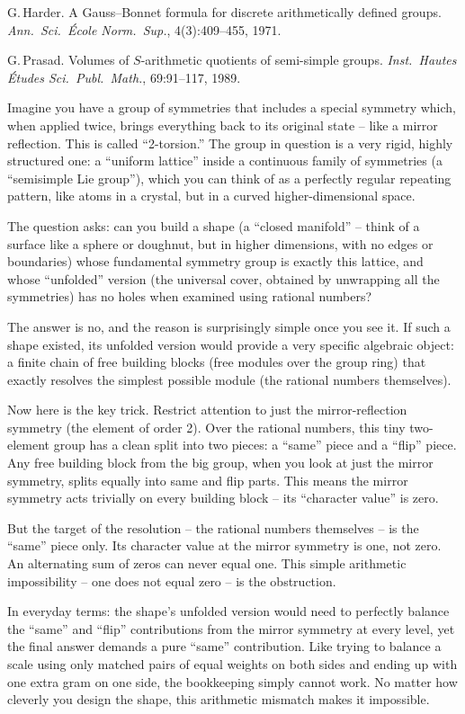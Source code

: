  G.\,Harder.
A Gauss--Bonnet formula for discrete arithmetically defined groups.
\emph{Ann.\ Sci.\ \'Ecole Norm.\ Sup.}, 4(3):409--455, 1971.

 G.\,Prasad.
Volumes of $S$-arithmetic quotients of semi-simple groups.
\emph{Inst.\ Hautes \'Etudes Sci.\ Publ.\ Math.}, 69:91--117, 1989.


Imagine you have a group of symmetries that includes a special symmetry which,
when applied twice, brings everything back to its original state -- like a
mirror reflection. This is called ``2-torsion.'' The group in question is a
very rigid, highly structured one: a ``uniform lattice'' inside a continuous
family of symmetries (a ``semisimple Lie group''), which you can think of as a
perfectly regular repeating pattern, like atoms in a crystal, but in a curved
higher-dimensional space.

The question asks: can you build a shape (a ``closed manifold'' -- think of a
surface like a sphere or doughnut, but in higher dimensions, with no edges or
boundaries) whose fundamental symmetry group is exactly this lattice, and whose
``unfolded'' version (the universal cover, obtained by unwrapping all the
symmetries) has no holes when examined using rational numbers?

The answer is no, and the reason is surprisingly simple once you see it. If
such a shape existed, its unfolded version would provide a very specific
algebraic object: a finite chain of free building blocks (free modules over the
group ring) that exactly resolves the simplest possible module (the rational
numbers themselves).

Now here is the key trick. Restrict attention to just the mirror-reflection
symmetry (the element of order 2). Over the rational numbers, this tiny
two-element group has a clean split into two pieces: a ``same'' piece and a
``flip'' piece. Any free building block from the big group, when you look at
just the mirror symmetry, splits equally into same and flip parts. This means
the mirror symmetry acts trivially on every building block -- its
``character value'' is zero.

But the target of the resolution -- the rational numbers themselves -- is the
``same'' piece only. Its character value at the mirror symmetry is one, not
zero. An alternating sum of zeros can never equal one. This simple arithmetic
impossibility -- one does not equal zero -- is the obstruction.

In everyday terms: the shape's unfolded version would need to perfectly balance
the ``same'' and ``flip'' contributions from the mirror symmetry at every
level, yet the final answer demands a pure ``same'' contribution. Like trying
to balance a scale using only matched pairs of equal weights on both sides and
ending up with one extra gram on one side, the bookkeeping simply cannot work.
No matter how cleverly you design the shape, this arithmetic mismatch makes it
impossible.
